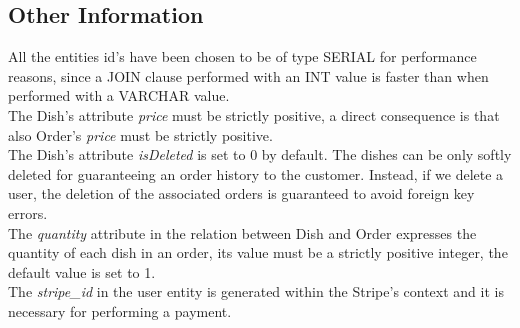 \subsection{Other Information}


All the entities id's have been chosen to be of type SERIAL for performance reasons, since a JOIN clause performed with an INT value is faster than when performed with a VARCHAR value.\\
The Dish's attribute \textit{price} must be strictly positive, a direct consequence is that also Order's \textit{price} must be strictly positive.\\
The Dish's attribute \textit{isDeleted} is set to 0 by default. The dishes can be only softly deleted for guaranteeing an order history to the customer. Instead, if we delete a user, the deletion of the associated orders is guaranteed to avoid foreign key errors. \\
The \textit{quantity} attribute in the relation between Dish and Order expresses the quantity of each dish in an order, its value must be a strictly positive integer, the default value is set to 1.\\
The \textit{stripe\_id} in the user entity is generated within the Stripe's context and it is necessary for performing a payment.
